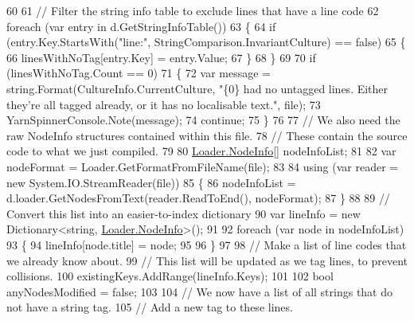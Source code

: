 \begin{DoxyCode}
60 
61                 \textcolor{comment}{// Filter the string info table to exclude lines that have a line code}
62                 \textcolor{keywordflow}{foreach} (var entry \textcolor{keywordflow}{in} d.GetStringInfoTable())
63                 \{
64                     \textcolor{keywordflow}{if} (entry.Key.StartsWith(\textcolor{stringliteral}{"line:"}, StringComparison.InvariantCulture) == \textcolor{keyword}{false})
65                     \{
66                         linesWithNoTag[entry.Key] = entry.Value;
67                     \}
68                 \}
69 
70                 \textcolor{keywordflow}{if} (linesWithNoTag.Count == 0)
71                 \{
72                     var message = string.Format(CultureInfo.CurrentCulture, \textcolor{stringliteral}{"\{0\} had no untagged lines.
       Either they're all tagged already, or it has no localisable text."}, file);
73                     YarnSpinnerConsole.Note(message);
74                     \textcolor{keywordflow}{continue};
75                 \}
76 
77                 \textcolor{comment}{// We also need the raw NodeInfo structures contained within this file.}
78                 \textcolor{comment}{// These contain the source code to what we just compiled.}
79 
80                 \hyperlink{a00140}{Loader.NodeInfo}[] nodeInfoList;
81 
82                 var nodeFormat = Loader.GetFormatFromFileName(file);
83 
84                 \textcolor{keyword}{using} (var reader = \textcolor{keyword}{new} System.IO.StreamReader(file))
85                 \{
86                     nodeInfoList = d.loader.GetNodesFromText(reader.ReadToEnd(), nodeFormat);
87                 \}
88 
89                 \textcolor{comment}{// Convert this list into an easier-to-index dictionary}
90                 var lineInfo = \textcolor{keyword}{new} Dictionary<string, \hyperlink{a00140}{Loader.NodeInfo}>();
91 
92                 \textcolor{keywordflow}{foreach} (var node \textcolor{keywordflow}{in} nodeInfoList)
93                 \{
94                     lineInfo[node.title] = node;
95 
96                 \}
97 
98                 \textcolor{comment}{// Make a list of line codes that we already know about.}
99                 \textcolor{comment}{// This list will be updated as we tag lines, to prevent collisions.}
100                 existingKeys.AddRange(lineInfo.Keys);
101 
102                 \textcolor{keywordtype}{bool} anyNodesModified = \textcolor{keyword}{false};
103 
104                 \textcolor{comment}{// We now have a list of all strings that do not have a string tag.}
105                 \textcolor{comment}{// Add a new tag to these lines.}

\end{DoxyCode}
